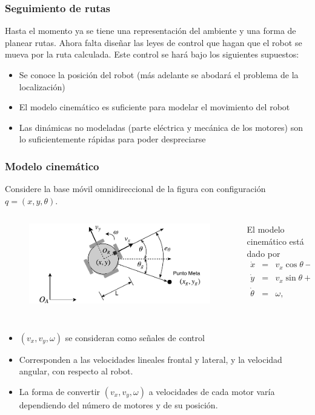\begin{frame}\frametitle{Seguimiento de rutas}
  Hasta el momento ya se tiene una representación del ambiente y una forma de planear rutas. Ahora falta diseñar las leyes de control que hagan que el robot se mueva por la ruta calculada. Este control se hará bajo los siguientes supuestos:
  \begin{itemize}
  \item Se conoce la posición del robot (más adelante se abodará el problema de la localización)
  \item El modelo cinemático es suficiente para modelar el movimiento del robot 
  \item Las dinámicas no modeladas (parte eléctrica y mecánica de los motores) son lo suficientemente rápidas para poder despreciarse
  \end{itemize}
\end{frame}

\begin{frame}\frametitle{Modelo cinemático}
  Considere la base móvil omnidireccional de la figura con configuración $q=(x,y,\theta)$.
  \begin{columns}
    \begin{column}{0.5\textwidth}
      \begin{figure}
        \centering
        \includegraphics[width=\textwidth]{Figures/GoalPose.pdf}
      \end{figure}
    \end{column}
    \begin{column}{0.5\textwidth}
      El modelo cinemático está dado por
      \begin{eqnarray*} 
        \dot{x} &=& v_x\cos\theta - v_y\sin\theta\label{eq:Kinematic1}\\         
        \dot{y} &=& v_x\sin\theta + v_y\cos\theta\\ 
        \dot{\theta} &=& \omega,\label{eq:Kinematic3}
      \end{eqnarray*}
    \end{column}
  \end{columns}
  \[\]
  \begin{itemize}
  \item $(v_x, v_y, \omega)$ se consideran como señales de control
  \item Corresponden a las velocidades lineales frontal y lateral, y la velocidad angular, con respecto al robot.
  \item La forma de convertir $(v_x, v_y, \omega)$ a velocidades de cada motor varía dependiendo del número de motores y de su posición. 
  \end{itemize}
\end{frame}

